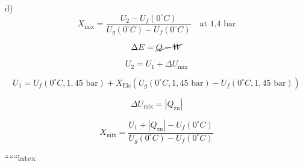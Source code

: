 d)
\[
X_{\text{mix}} = \frac{U_2 - U_f(0^\circ C)}{U_g(0^\circ C) - U_f(0^\circ C)} \quad \text{at 1,4 bar}
\]

\[
\Delta E = \cancel{Q - W}
\]

\[
U_2 = U_1 + \Delta U_{\text{mix}}
\]

\[
U_1 = U_f(0^\circ C, 1,45 \text{ bar}) + X_{\text{Eis}} \left( U_g(0^\circ C, 1,45 \text{ bar}) - U_f(0^\circ C, 1,45 \text{ bar}) \right)
\]

\[
\Delta U_{\text{mix}} = |Q_{\text{zu}}|
\]

\[
X_{\text{mix}} = \frac{U_1 + |Q_{\text{zu}}| - U_f(0^\circ C)}{U_g(0^\circ C) - U_f(0^\circ C)}
\]

``````latex